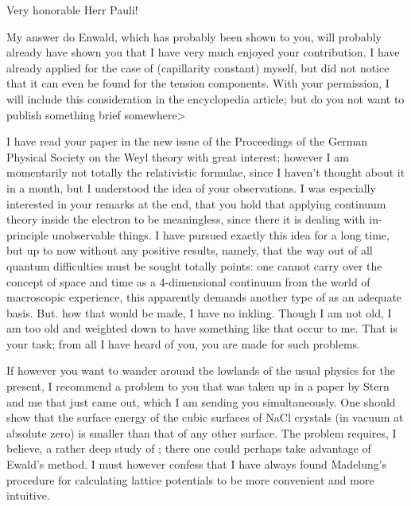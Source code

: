 \begin{letter}{4}
\begin{header}
\date{1919/12/23}


\makeheader

\end{header}

Very honorable Herr Pauli!

My answer do Enwald, which has probably been shown to you, will probably already have shown you that I have very much enjoyed your contribution. I have already applied  for the case of  (capillarity constant) myself, but did not notice that it can even be found for the tension components. With your permission, I will include this consideration in the encyclopedia article; but do you not want to publish something brief somewhere>

I have read your paper in the new issue of the Proceedings of the German Physical Society on the Weyl theory with great interest; however I am momentarily not totally  the relativistic formulae, since I haven't thought about it in a month, but I understood the idea of your observations. I was especially interested in your remarks at the end, that you hold that applying continuum theory inside the electron to be meaningless, since there it is dealing with in-principle unobservable things. I have pursued exactly this idea for a long time, but up to now without any positive results, namely, that the way out of all quantum difficulties must be sought totally  points: one cannot carry over the concept of space and time as a 4-dimensional continuum from the world of macroscopic experience, this apparently demands another type of  as an adequate basis. But. how that would be made, I have no inkling. Though I am not old, I am too old and weighted down to have something like that occur to me. That is your task; from all I have heard of you, you are made for such problems.

If however you want to wander around the lowlands of the usual physics for the present, I recommend a problem to you that was taken up in a paper by Stern and me that just came out, which I am sending you simultaneously. One should show that the surface energy of the cubic surfaces of NaCl crystals (in vacuum at absolute zero) is smaller than that of any other surface. The problem requires, I believe, a rather deep study of ; there one could perhaps take advantage of Ewald's method. I must however confess that I have always found Madelung's procedure for calculating lattice potentials to be more convenient and more intuitive.


\end{letter}
